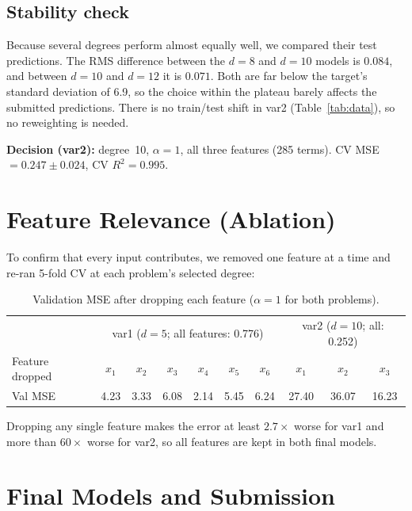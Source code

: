 \documentclass[11pt,a4paper]{article}
\begin{document}
\subsection{Stability check}
Because several degrees perform almost equally well, we compared their test
predictions. The RMS difference between the $d{=}8$ and $d{=}10$ models is $0.084$,
and between $d{=}10$ and $d{=}12$ it is $0.071$. Both are far below the
target's standard deviation of 6.9, so the choice within the plateau barely affects
the submitted predictions. There is no train/test shift in var2 (Table~\ref{tab:data}),
so no reweighting is needed.

\noindent\textbf{Decision (var2):} degree~10, $\alpha=1$, all three features
(285 terms). CV MSE $=0.247\pm0.024$, CV $R^2 = 0.995$.

\section{Feature Relevance (Ablation)}
To confirm that every input contributes, we removed one feature at a time and
re-ran 5-fold CV at each problem's selected degree:

\begin{table}[H]
\centering
\small
\begin{tabular}{lcccccc|ccc}
\toprule
 & \multicolumn{6}{c|}{var1 ($d{=}5$; all features: 0.776)} & \multicolumn{3}{c}{var2 ($d{=}10$; all: 0.252)} \\
Feature dropped & $x_1$ & $x_2$ & $x_3$ & $x_4$ & $x_5$ & $x_6$ & $x_1$ & $x_2$ & $x_3$ \\
\midrule
Val MSE & 4.23 & 3.33 & 6.08 & 2.14 & 5.45 & 6.24 & 27.40 & 36.07 & 16.23 \\
\bottomrule
\end{tabular}
\caption{Validation MSE after dropping each feature ($\alpha{=}1$ for both problems).}
\label{tab:ablation}
\end{table}

Dropping any single feature makes the error at least $2.7\times$ worse for var1 and
more than $60\times$ worse for var2, so all features are kept in both final models.

\section{Final Models and Submission}
\end{document}
